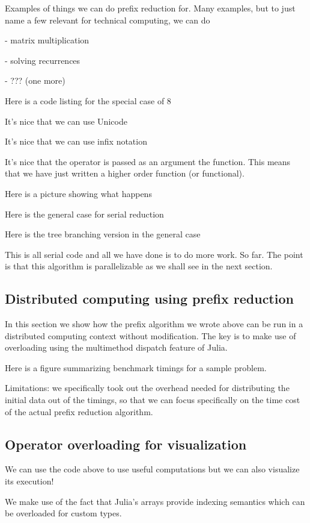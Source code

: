 \documentclass{sig-alternate}
\begin{document}
Examples of things we can do prefix reduction for. Many examples, but to just name a few relevant for technical computing, we can do 

- matrix multiplication

- solving recurrences

- ??? (one more)

Here is a code listing for the special case of 8

It's nice that we can use Unicode

It's nice that we can use infix notation

It's nice that the operator is passed as an argument the function. This means that we have just written a higher order function (or functional).

Here is a picture showing what happens

Here is the general case for serial reduction

Here is the tree branching version in the general case

This is all serial code and all we have done is to do more work. So far. The point is that this algorithm is parallelizable as we shall see in the next section.

\subsection{Distributed computing using prefix reduction}

In this section we show how the prefix algorithm we wrote above can be run in a distributed computing context without modification. The key is to make use of overloading using the multimethod dispatch feature of Julia.

Here is a figure summarizing benchmark timings for a sample problem.

Limitations: we specifically took out the overhead needed for distributing the initial data out of the timings, so that we can focus specifically on the time cost of the actual prefix reduction algorithm.

\subsection{Operator overloading for visualization}

We can use the code above to use useful computations but we can also visualize its execution!

We make use of the fact that Julia's arrays provide indexing semantics which can be overloaded for custom types.
\end{document}
